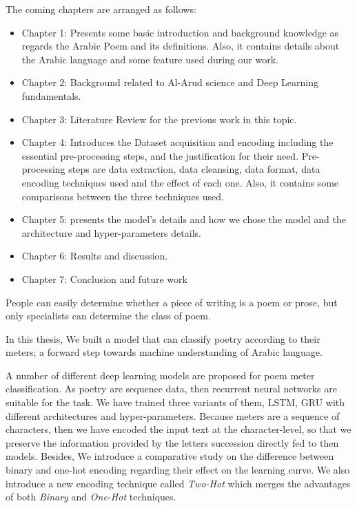 \newpage


\begin{spacing}{1}\end{spacing}
The coming chapters are arranged as follows:
\begin{itemize}
\item Chapter 1: Presents some basic introduction and background knowledge as regards the Arabic Poem and its definitions. Also, it contains details about the Arabic language and some feature used during our work.
  \item Chapter 2: Background related to Al-Arud science and Deep Learning fundamentals. 
  \item Chapter 3: Literature Review for the previous work in this topic.    
  \item Chapter 4: Introduces the Dataset acquisition and encoding including the essential pre-processing steps, and the justification for their need. Pre-processing steps are data extraction, data cleansing, data format, data encoding techniques used and the effect of each one. Also, it contains some comparisons between the three techniques used.
  \item Chapter 5: presents the model's details and how we chose the model and the architecture and hyper-parameters details.
  \item Chapter 6: Results and discussion.
  \item Chapter 7: Conclusion and future work
\end{itemize}


 \newpage




\begin{spacing}{1}\end{spacing}


People can easily determine whether a piece of writing is a poem or prose, but only specialists can determine the class of poem.

In this thesis, We built a model that can classify poetry according to their meters; a forward step towards machine understanding of Arabic language.

A number of different deep learning models are proposed for poem meter classification. As poetry are sequence data, then recurrent neural networks are suitable for the task. We have trained three variants of them, LSTM, GRU with different architectures and hyper-parameters. Because meters are a sequence of characters, then we have encoded the input text at the character-level, so that we preserve the information provided by the letters succession directly fed to then models. Besides, We introduce a comparative study on the difference between binary and one-hot encoding regarding their effect on the learning curve. We also introduce a new encoding technique called \textit{Two-Hot} which merges the advantages of both \textit{Binary} and \textit{One-Hot} techniques.


